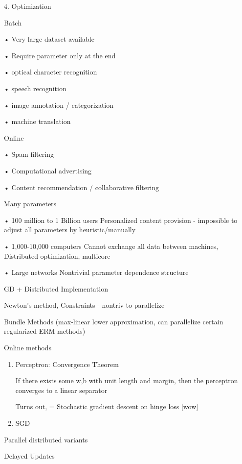 \documentclass[english]{article}
\begin{document}
\item  4. Optimization
\benum 
\item Batch

• Very large dataset available

• Require parameter only at the end

• optical character recognition

• speech recognition

• image annotation / categorization

• machine translation

\item 
Online


• Spam filtering

• Computational advertising

• Content recommendation / collaborative filtering
\item 
Many parameters

• 100 million to 1 Billion users
Personalized content provision - impossible to
adjust all parameters by heuristic/manually

• 1,000-10,000 computers
Cannot exchange all data between machines,
Distributed optimization, multicore

• Large networks
Nontrivial parameter dependence structure

\item 
GD + Distributed Implementation

\item Newton's method, Constraints - nontriv to parallelize

\item 
Bundle Methods (max-linear lower approximation, can parallelize certain regularized ERM methods)

\item 
Online methods
\begin{enumerate}
\item Perceptron: Convergence Theorem
    
    If there exists some w,b with unit length and margin, then the perceptron converges to a linear separator
    
    Turns out, = Stochastic gradient descent on hinge loss [wow]
\item  SGD
\end{enumerate}

\item
Parallel distributed variants

Delayed Updates
\end{document}
